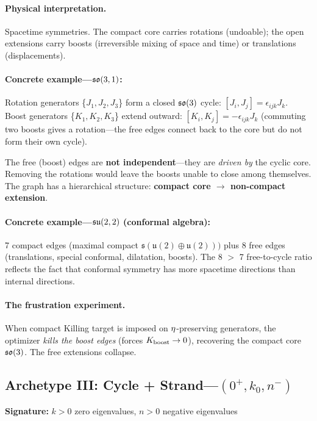 \paragraph{Physical interpretation.} Spacetime symmetries. The compact core carries rotations (undoable); the open extensions carry boosts (irreversible mixing of space and time) or translations (displacements).

\paragraph{Concrete example---$\mathfrak{so}(3,1)$:}Rotation generators \{$J_1, J_2, J_3$\} form a closed $\mathfrak{so}(3)$ cycle: $[J_i, J_j] = \epsilon_{ijk} J_k$. Boost generators  \{$K_1, K_2, K_3$\} extend outward: $[K_i, K_j] = -\epsilon_{ijk} J_k$ (commuting two boosts gives a rotation---the free edges connect back to the core but do not form their own cycle).

The free (boost) edges are \textbf{not independent}---they are \emph{driven by} the cyclic core. Removing the rotations would leave the boosts unable to close among themselves. The graph has a hierarchical structure: \textbf{compact core $\to$ non-compact extension}.

\paragraph{Concrete example---$\mathfrak{su}(2,2)$ (conformal algebra):}7 compact edges (maximal compact $\mathfrak{s}(\mathfrak{u}(2) \oplus \mathfrak{u}(2)))$ plus 8 free edges (translations, special conformal, dilatation, boosts). The 8 $>$ 7 free-to-cycle ratio reflects the fact that conformal symmetry has more spacetime directions than internal directions.

\paragraph{The frustration experiment.} When compact Killing target is imposed on $\eta$-preserving generators, the optimizer \emph{kills the boost edges} (forces $K_{\mathrm{boost}} \to 0$), recovering the compact core $\mathfrak{so}(3)$. The free extensions collapse.

\subsection{Archetype III: Cycle + Strand---$(0^+, k_0, n^-)$}\label{sec:archetype_III}

\textbf{Signature:} $k > 0$ zero eigenvalues, $n > 0$ negative eigenvalues

